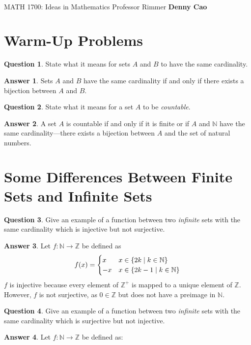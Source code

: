 \documentclass[article, 12pt]{article}
\title{\LARGE\bf{\psetName}}
\author{\name}
\date{\dueDate}
\author{\name}
\date{\dueDate}
\makeatletter
\theoremstyle{definition}
\newcommand{\courseNumber}{MATH 1700}
\newcommand{\courseName}{Ideas in Mathematics}
\newcommand{\professor}{Professor Rimmer}
\newcommand{\name}{Denny Cao}
\newtheorem{question}{Question}
\newtheorem{answer}{Answer}
\DeclarePairedDelimiter\set{\{}{\}}
\newcommand{\ints}{\mathbb{Z}}
\newcommand{\nats}{\mathbb{N}}
\renewcommand{\maketitle}{\bgroup\setlength{\parindent}{0pt}
    \begin{flushleft}
        \textbf{\@title} \\ \vskip0.2cm
        \begingroup
            \fontsize{14pt}{12pt}\selectfont
            \courseNumber: \courseName 
            \vskip0.3cm 
            \professor
        \endgroup \vskip0.3cm
        \@date \hfill\rlap{}\bf{\name} \\ \vskip0.1cm
        \hrulefill
    \end{flushleft}\egroup 
}
\makeatother
\begin{document}
    \maketitle
    \thispagestyle{empty}

    \section{Warm-Up Problems}
    \begin{question}
        State what it means for sets $A$ and $B$ to have the same cardinality.
    \end{question}

    \begin{answer}
        Sets $A$ and $B$ have the same cardinality if and only if there exists a bijection between $A$ and $B$.
    \end{answer}

    \begin{question}
        State what it means for a set $A$ to be \textit{countable}.
    \end{question}

    \begin{answer}
        A set $A$ is countable if and only if it is finite or if $A$ and $\nats$ have the same cardinality---there exists a bijection between $A$ and the set of natural numbers.
    \end{answer}

    \section{Some Differences Between Finite Sets and Infinite Sets}
    \begin{question}
        Give an example of a function between two \textit{infinite} sets with the same cardinality which is injective but not surjective.
    \end{question}

    \begin{answer}
        Let $f: \nats \to \ints$ be defined as 
        \[ f(x) = \begin{cases} 
            x & x \in \set*{2k \mid k \in \nats} \\
            -x & x \in \set*{2k - 1 \mid k \in \nats}
        \end{cases} \]
        $f$ is injective because every element of $\ints^+$ is mapped to a unique element of $\ints$. However, $f$ is not surjective, as $0 \in \ints$ but does not have a preimage in $\nats$.
    \end{answer}

    \begin{question}
        Give an example of a function between two \textit{infinite} sets with the same cardinality which is surjective but not injective.
    \end{question}

    \begin{answer}
        Let $f: \nats \to \ints$ be defined as:
    \end{answer}
\end{document}
